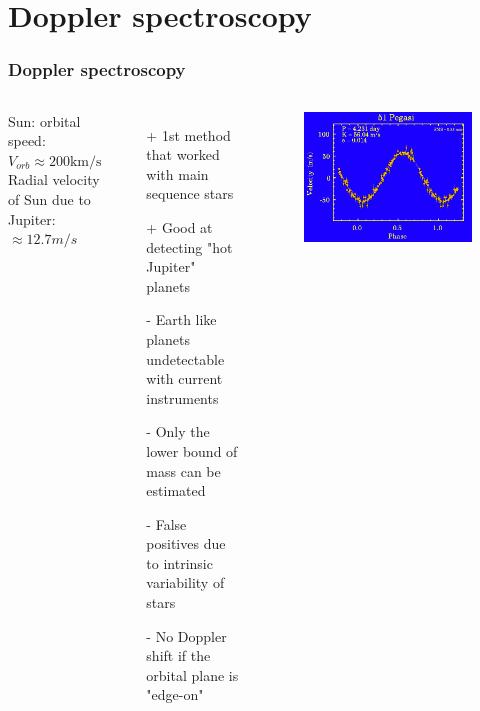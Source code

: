 \documentclass[aspectratio=169]{beamer}
\begin{document}
\section{Doppler spectroscopy}
\begin{frame}
\frametitle{Doppler spectroscopy}

\begin{columns}
Sun: orbital speed: $V_{orb} \approx 200 \mathrm{km/s}$ \\
Radial velocity of Sun due to Jupiter: $\approx 12.7 m/s$ \\
\begin{itemize}
\item[+] 1st method that worked with main sequence stars
\item[+] Good at detecting "hot Jupiter" planets
\item[-] Earth like planets undetectable with current instruments
\item[-] Only the lower bound of mass can be estimated
\item[-] False positives due to intrinsic variability of stars
\item[-] No Doppler shift if the orbital plane is "edge-on"
\end{itemize}
\begin{figure}
\includegraphics[width=\textwidth]{img/51Pegasi.png}

\end{figure}
\end{columns}
\end{frame}
\end{document}
